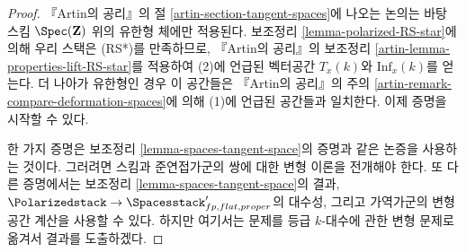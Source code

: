 \begin{proof}
『Artin의 공리』의 절 \ref{artin-section-tangent-spaces}에 나오는 논의는
바탕 스킴 $\Spec(\mathbf{Z})$ 위의 유한형 체에만 적용된다. 보조정리
\ref{lemma-polarized-RS-star}에 의해 우리 스택은 (RS*)를 만족하므로,
『Artin의 공리』의 보조정리 \ref{artin-lemma-properties-lift-RS-star}를 적용하여
(2)에 언급된 벡터공간 $T_x(k)$와 $\text{Inf}_x(k)$를 얻는다. 더 나아가
유한형인 경우 이 공간들은 『Artin의 공리』의 주의
\ref{artin-remark-compare-deformation-spaces}에 의해 (1)에 언급된 공간들과
일치한다. 이제 증명을 시작할 수 있다.

\medskip\noindent
한 가지 증명은 보조정리 \ref{lemma-spaces-tangent-space}의 증명과 같은 논증을
사용하는 것이다. 그러려면 스킴과 준연접가군의 쌍에 대한 변형 이론을 전개해야
한다. 또 다른 증명에서는 보조정리 \ref{lemma-spaces-tangent-space}의 결과,
$\Polarizedstack \to \Spacesstack'_{fp, flat, proper}$의 대수성, 그리고
가역가군의 변형공간 계산을 사용할 수 있다. 하지만 여기서는 문제를 등급
$k$-대수에 관한 변형 문제로 옮겨서 결과를 도출하겠다.


\end{proof}

